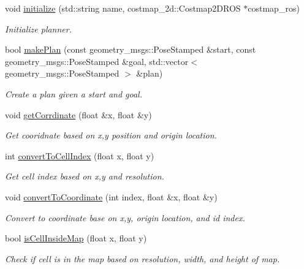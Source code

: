 \begin{DoxyCompactItemize}
\item 
void \hyperlink{class_r_astar__planner_1_1_r_astar_planner_r_o_s_aed71ff1907cf853c7e49e78d3f82a94b}{initialize} (std\+::string name, costmap\+\_\+2d\+::\+Costmap2\+D\+R\+OS $\ast$costmap\+\_\+ros)
\begin{DoxyCompactList}\small\item\em Initialize planner. \end{DoxyCompactList}\item 
bool \hyperlink{class_r_astar__planner_1_1_r_astar_planner_r_o_s_acdc8059b6324f030c47ec2322f69f658}{make\+Plan} (const geometry\+\_\+msgs\+::\+Pose\+Stamped \&start, const geometry\+\_\+msgs\+::\+Pose\+Stamped \&goal, std\+::vector$<$ geometry\+\_\+msgs\+::\+Pose\+Stamped $>$ \&plan)
\begin{DoxyCompactList}\small\item\em Create a plan given a start and goal. \end{DoxyCompactList}\item 
void \hyperlink{class_r_astar__planner_1_1_r_astar_planner_r_o_s_abbc4c3daf28590f0d5e45c8227b7ff9e}{get\+Corrdinate} (float \&x, float \&y)
\begin{DoxyCompactList}\small\item\em Get cooridnate based on x,y position and origin location. \end{DoxyCompactList}\item 
int \hyperlink{class_r_astar__planner_1_1_r_astar_planner_r_o_s_a50f7adc635522b9ea7f5348870b7ca6e}{convert\+To\+Cell\+Index} (float x, float y)
\begin{DoxyCompactList}\small\item\em Get cell index based on x,y and resolution. \end{DoxyCompactList}\item 
void \hyperlink{class_r_astar__planner_1_1_r_astar_planner_r_o_s_a1046296d428b694e517ef25cac423846}{convert\+To\+Coordinate} (int index, float \&x, float \&y)
\begin{DoxyCompactList}\small\item\em Convert to coordinate base on x,y, origin location, and id index. \end{DoxyCompactList}\item 
bool \hyperlink{class_r_astar__planner_1_1_r_astar_planner_r_o_s_a1d3f1b7aed836e648645dd696823193b}{is\+Cell\+Inside\+Map} (float x, float y)
\begin{DoxyCompactList}\small\item\em Check if cell is in the map based on resolution, width, and height of map. \end{DoxyCompactList}\item 

\end{DoxyCompactItemize}
